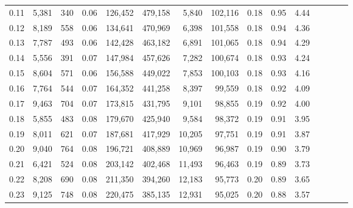 \begin{tabular}{rrrcrrrrrrrrrrr}
0.11 &   5,381 &     340 &                                       0.06 &  126,452 &  479,158 &    5,840 &  102,116 &  0.18 &  0.95 &                         4.44 \\
0.12 &   8,189 &     558 &                                       0.06 &  134,641 &  470,969 &    6,398 &  101,558 &  0.18 &  0.94 &                         4.36 \\
0.13 &   7,787 &     493 &                                       0.06 &  142,428 &  463,182 &    6,891 &  101,065 &  0.18 &  0.94 &                         4.29 \\
0.14 &   5,556 &     391 &                                       0.07 &  147,984 &  457,626 &    7,282 &  100,674 &  0.18 &  0.93 &                         4.24 \\
0.15 &   8,604 &     571 &                                       0.06 &  156,588 &  449,022 &    7,853 &  100,103 &  0.18 &  0.93 &                         4.16 \\
0.16 &   7,764 &     544 &                                       0.07 &  164,352 &  441,258 &    8,397 &   99,559 &  0.18 &  0.92 &                         4.09 \\
0.17 &   9,463 &     704 &                                       0.07 &  173,815 &  431,795 &    9,101 &   98,855 &  0.19 &  0.92 &                         4.00 \\
0.18 &   5,855 &     483 &                                       0.08 &  179,670 &  425,940 &    9,584 &   98,372 &  0.19 &  0.91 &                         3.95 \\
0.19 &   8,011 &     621 &                                       0.07 &  187,681 &  417,929 &   10,205 &   97,751 &  0.19 &  0.91 &                         3.87 \\
0.20 &   9,040 &     764 &                                       0.08 &  196,721 &  408,889 &   10,969 &   96,987 &  0.19 &  0.90 &                         3.79 \\
0.21 &   6,421 &     524 &                                       0.08 &  203,142 &  402,468 &   11,493 &   96,463 &  0.19 &  0.89 &                         3.73 \\
0.22 &   8,208 &     690 &                                       0.08 &  211,350 &  394,260 &   12,183 &   95,773 &  0.20 &  0.89 &                         3.65 \\
0.23 &   9,125 &     748 &                                       0.08 &  220,475 &  385,135 &   12,931 &   95,025 &  0.20 &  0.88 &                         3.57 \\

\end{tabular}

